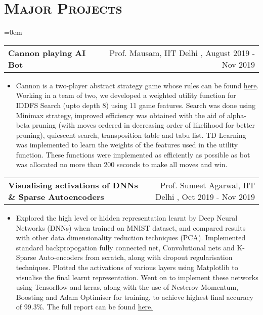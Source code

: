 \documentclass{article}
\makeatletter
\newenvironment{longversion}{}{} %
\newenvironment{absolutelynopagebreak}
  {\par\nobreak\vfil\penalty0\vfilneg
   \vtop\bgroup}
  {\par\xdef\tpd{\the\prevdepth}\egroup
   \prevdepth=\tpd}
\newcommand{\headerrow}[2]
{\begin{tabular*}{\linewidth}{l@{\extracolsep{\fill}}r}
	#1 &
	#2 \\
\end{tabular*}}
\newcommand{\tmpsection}[1]{}
\let\tmpsection=\section
\renewcommand{\section}[1]{\tmpsection*{\textsc{#1}}}
\makeatother
\begin{document}
\begin{longversion}
\section{Major Projects}
\begin{list} {}{\leftmargin=0em}
\setlength{\leftmargin}{0pt}

 \item[]
\headerrow { \textbf{Cannon playing AI Bot}} {Prof. Mausam, IIT Delhi , August 2019 - Nov 2019}
 \begin{itemize} \item[]
Cannon is a two-player abstract strategy game whose rules can be found \href{https://nestorgames.com/rulebooks/CANNON_EN.pdf}{here}. Working in a team of two, we developed a weighted utility function for IDDFS Search (upto depth 8) using 11 game features. Search was done using Minimax strategy, improved efficiency was obtained with the aid of alpha-beta pruning (with moves ordered in decreasing order of likelihood for better pruning), quiescent search, transposition table and tabu list. TD Learning was implemented to learn the weights of the features used in the utility function. These functions were implemented as efficiently as possible as bot was allocated no more than 200 seconds to make all moves and win.
 \end{itemize}

 \item[]
\headerrow { \textbf{Visualising activations of DNNs \& Sparse Autoencoders}} {Prof. Sumeet Agarwal, IIT Delhi , Oct 2019 - Nov 2019}
 \begin{itemize} \item[]
Explored the high level or hidden representation learnt by Deep Neural Networks (DNNs) when trained on MNIST dataset, and compared results with other data dimensionality reduction techniques (PCA). Implemented standard backpropogation fully connected net, Convolutional nets and K-Sparse Auto-encoders from scratch, along with dropout regularisation techniques. Plotted the activations of various layers using Matplotlib to visualise the final learnt representation. Went on to implement these networks using Tensorflow and keras, along with the use of Nesterov Momentum, Boosting and Adam Optimiser for training, to achieve highest final accuracy of 99.3\%. The full report can be found \href{https://csciitd-my.sharepoint.com/:w:/g/personal/ee1170938_csciitd_onmicrosoft_com/EVa7dWSz8t1Dlt3IZ5EXa_QB0ppdpWLaf5AHSk3PCPcv0g?e=wS6EWa}{here.}
 \end{itemize}
 

\end{list}
\end{longversion}
\end{document}
